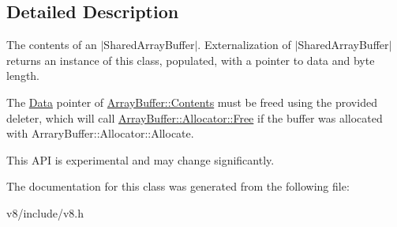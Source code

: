 \subsection{Detailed Description}
The contents of an $\vert$\+Shared\+Array\+Buffer$\vert$. Externalization of $\vert$\+Shared\+Array\+Buffer$\vert$ returns an instance of this class, populated, with a pointer to data and byte length.

The \mbox{\hyperlink{classv8_1_1Data}{Data}} pointer of \mbox{\hyperlink{classv8_1_1ArrayBuffer_1_1Contents}{Array\+Buffer\+::\+Contents}} must be freed using the provided deleter, which will call \mbox{\hyperlink{classv8_1_1ArrayBuffer_1_1Allocator_a419f59d2a103a5a8863809d7977c9cd8}{Array\+Buffer\+::\+Allocator\+::\+Free}} if the buffer was allocated with Arrary\+Buffer\+::\+Allocator\+::\+Allocate.

This A\+PI is experimental and may change significantly. 

The documentation for this class was generated from the following file\+:\begin{DoxyCompactItemize}
\item 
v8/include/v8.\+h\end{DoxyCompactItemize}
